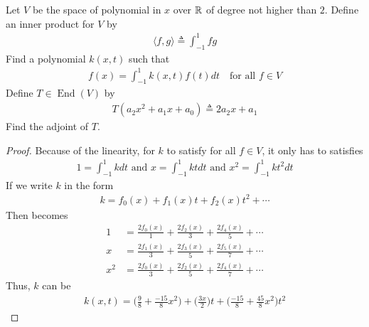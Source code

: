 \documentclass{report}
\begin{document}
\begin{question}{}{}
Let $V$ be the space of polynomial in $x$ over  $\mathbb{R}$ of degree not higher than  $2$. Define an inner product for $V$ by 
\begin{align*}
\langle f,g\rangle \triangleq \int_{-1}^{1} fg
\end{align*}
Find a polynomial $k(x,t)$ such that 
\begin{align}
\label{fx=}
f(x)= \int_{-1}^{1}k(x,t)f(t)dt \quad\text{for all }f \in V
\end{align}
Define $T \in \operatorname{End}(V)$ by 
\begin{align*}
T(a_2x^2+a_1x+a_0) \triangleq 2a_2x+a_1
\end{align*}
Find the adjoint of $T$. 
\end{question}
\begin{proof}
Because of the linearity, for $k$ to satisfy  for all $f\in V$, it only has to satisfies 
\begin{align}
\label{solve}
1=\int_{-1}^{1}kdt\text{ and }x=\int_{-1}^{1}ktdt \text{ and }x^2 =\int_{-1}^{1}kt^2dt
\end{align}
If we write $k$ in the form 
\begin{align*}
k= f_0(x)+ f_1(x)t+ f_2(x)t^2 + \cdots 
\end{align*}
Then  becomes 
\begin{align*}
1&= \frac{2f_0(x)}{1}+ \frac{2f_2(x)}{3}+ \frac{2f_4(x)}{5}+ \cdots  \\
x&=  \frac{2f_1(x)}{3}+ \frac{2f_3(x)}{5}+ \frac{2f_5(x)}{7}+ \cdots \\
x^2&= \frac{2f_0(x)}{3} + \frac{2f_2(x)}{5}+ \frac{2f_4(x)}{7}+ \cdots 
\end{align*}
Thus, $k$ can be 
\begin{align*}
k(x,t)= \Big(\frac{9}{8}+ \frac{-15}{8}x^2\Big)+ \Big(\frac{3x}{2}\Big)t+ \Big(\frac{-15}{8}+ \frac{45}{8}x^2\Big)t^2 
\end{align*}
\end{proof}
\end{document}
